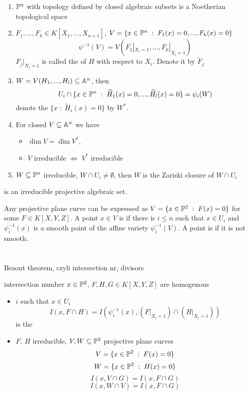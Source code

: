 \documentclass[twoside, a4paper, 12pt]{book}
\begin{document}
\begin{enumerate}
  \item $\mathbb{P}^n$ with topology defined by closed algebraic subsets is a Noetherian topological space
  \item $F_1,...,F_k\in K[X_1,..., X_{n+1}]$, $V=\{x\in\mathbb{P}^n\;:\;F_1(x)=0,..., F_k(x)=0\}$
    $$\psi^{-1}(V)=V(F_1|_{X_i=1},..., F_k|_{X_i=1})$$
    $F_j|_{X_i=1}$ is called the  of $H$ with respect to $X_i$. Denote it by $\widetilde{F}_j$
  \item $W=V(H_1,..., H_l)\subseteq\mathbb{A}^n$, then
    $$U_i\cap \{x\in\mathbb{P}^n\;:\;\widetilde{H}_1(x)=0,...,\widetilde{H}_l(x)=0\}=\psi_i(W)$$
    denote the $\{x\;:\;\widetilde{H}_i(x)=0\}$ by $W^*$.
  \item For closed $V\subseteq\mathbb{A}^n$ we have 
    \begin{itemize}
      \item $\dim V=\dim V^*$, 
      \item $V$ irreducible $\iff$ $V^*$ irreducible
    \end{itemize}
  \item $W\subseteq \mathbb{P}^n$ irreducible, $W\cap U_i\neq\emptyset$, then $W$ is the Zariski closure of $W\cap U_i$ 
\end{enumerate}

\begin{definition}{}{}
   is an irreducible projective algebraic set.
\end{definition}

Any projective plane curve can be expressed as $V=\{x\in\mathbb{P}^2\;:\;F(x)=0\}$ for some $F\in K[X,Y,Z]$.
{}
A point $x\in V$ is  if there is $i\leq n$ such that $x\in U_i$ and $\psi_i^{-1}(x)$ is a smooth point of the affine variety $\psi_i^{-1}(V)$. A point is  if it is not smooth.

\section{}{Bezout theorem, czyli intersection nr, divisors}

\begin{definition}{intersection number}{}
  $x\in\mathbb{P}^2$, $F,H,G\in K[X,Y, Z]$ are homogenous
  \begin{itemize}
    \item $i$ such that $x\in U_i$ 
      $$I(x, F\cap H)=I(\psi_i^{-1}(x), (F|_{X_i=1})\cap (H|_{X_i=1}))$$
      is the 
    \item $F$, $H$ irreducible, $V,W\subseteq\mathbb{P}^2$ projective plane curves
      $$V=\{x\in\mathbb{P}^2\;:\;F(x)=0\}$$
      $$W=\{x\in\mathbb{P}^2\;:\;H(x)=0\}$$
      $$I(x, V\cap G)=I(x, F\cap G)$$
      $$I(x, W\cap V)=I(x, F\cap G)$$
  \end{itemize}
\end{definition}
\end{document}
